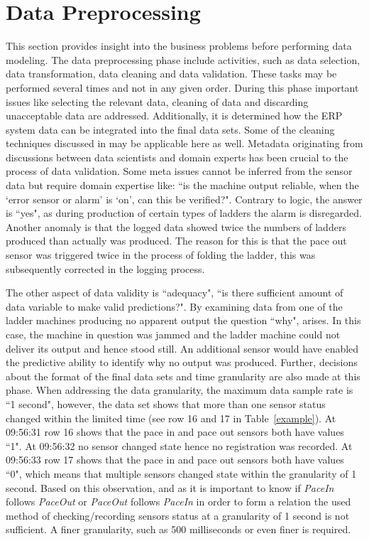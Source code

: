 \documentclass[runningheads]{llncs}
\begin{document}
\section {Data Preprocessing}
\label{sec:datapreparation}
This section provides insight into the business problems before performing data modeling. The data preprocessing phase include activities, such as data selection, data transformation, data cleaning and data validation. These tasks may be performed several times and not in any given order. During this phase important issues like selecting the relevant data, cleaning of data and discarding unacceptable data are addressed. Additionally, it is determined how the ERP system data can be integrated into the final data sets. Some of the cleaning techniques discussed in \cite{iftikhar} may be applicable here as well. Metadata originating from discussions between data scientists and domain experts has been crucial to the process of data validation. Some meta issues cannot be inferred from the sensor data but require domain expertise like: ``is the machine output reliable, when the `error sensor or alarm' is `on', can this be verified?". Contrary to logic, the answer is ``yes", as during production of certain types of ladders the alarm is disregarded. Another anomaly is that the logged data showed twice the numbers of ladders produced than actually was produced. The reason for this is that the pace out sensor was triggered twice in the process of folding the ladder, this was subsequently corrected in the logging process. 

The other aspect of data validity is ``adequacy", ``is there sufficient amount of data variable to make valid predictions?". By examining data from one of the ladder machines producing no apparent output the question ``why", arises. In this case, the machine in question was jammed and the ladder machine could not deliver its output and hence stood still. An additional sensor would have enabled the predictive ability to identify why no output was produced. Further, decisions about the format of the final data sets and time granularity are also made at this phase. When addressing the data granularity, the maximum data sample rate is ``1 second", however, the data set shows that more than one sensor status changed within the limited time (see row 16 and 17 in Table~\ref{example}). At 09:56:31 row 16 shows that the pace in and pace out sensors both have values ``1". At 09:56:32 no sensor changed state hence no registration was recorded. At 09:56:33 row 17 shows that the pace in and pace out sensors both have values ``0", which means that multiple sensors changed state within the granularity of 1 second. Based on this observation, and as it is important to know if \emph{PaceIn} follows \emph{PaceOut} or \emph{PaceOut} follows \emph{PaceIn} in order to form a relation the used method of checking/recording sensors status at a granularity of 1 second is not sufficient. A finer granularity, such as 500 milliseconds or even finer is required.
\end{document}
